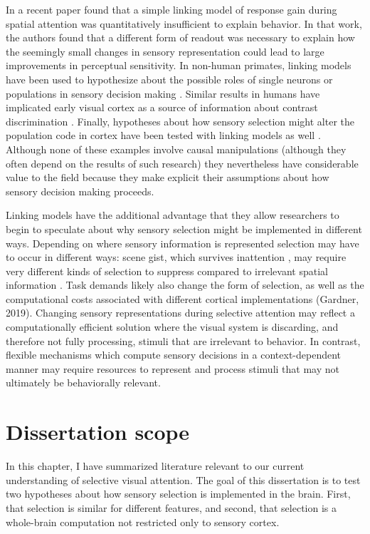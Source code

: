 In a recent paper \citet{Pestilli2011-gi} found that a simple linking model of response gain during spatial attention was quantitatively insufficient to explain behavior. In that work, the authors found that a different form of readout was necessary to explain how the seemingly small changes in sensory representation could lead to large improvements in perceptual sensitivity. In non-human primates, linking models have been used to hypothesize about the possible roles of single neurons or populations in sensory decision making \citep{Newsome1989-fr}. Similar results in humans have implicated early visual cortex as a source of information about contrast discrimination \citep{Boynton1999-jd}. Finally, hypotheses about how sensory selection might alter the population code in cortex have been tested with linking models as well \citep{Cohen2011-pa}. Although none of these examples involve causal manipulations (although they often depend on the results of such research) they nevertheless have considerable value to the field because they make explicit their assumptions about how sensory decision making proceeds.

Linking models have the additional advantage that they allow researchers to begin to speculate about why sensory selection might be implemented in different ways. Depending on where sensory information is represented selection may have to occur in different ways: scene gist, which survives inattention \citep{Li2002-ji,Peelen2009-us}, may require very different kinds of selection to suppress compared to irrelevant spatial information \citep{Pestilli2011-gi}. Task demands likely also change the form of selection, as well as the computational costs associated with different cortical implementations (Gardner, 2019). Changing sensory representations during selective attention may reflect a computationally efficient solution where the visual system is discarding, and therefore not fully processing, stimuli that are irrelevant to behavior. In contrast, flexible mechanisms which compute sensory decisions in a context-dependent manner \citep{Mante2013-tn} may require resources to represent and process stimuli that may not ultimately be behaviorally relevant. 

\section{Dissertation scope}

In this chapter, I have summarized literature relevant to our current understanding of selective visual attention. The goal of this dissertation is to test two hypotheses about how sensory selection is implemented in the brain. First, that selection is similar for different features, and second, that selection is a whole-brain computation not restricted only to sensory cortex. 

